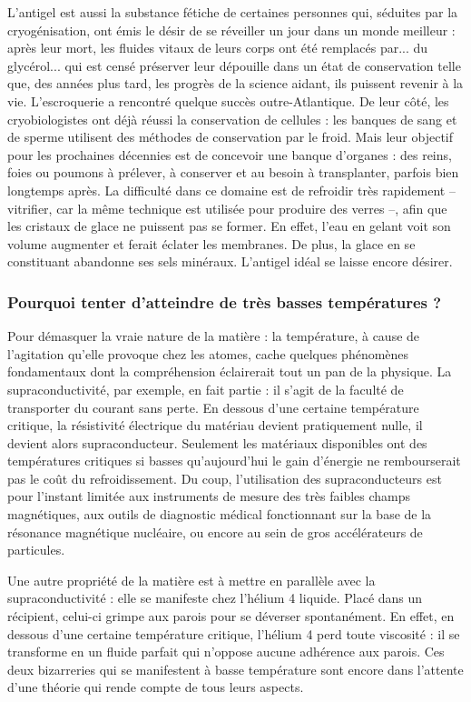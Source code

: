 L'antigel est aussi la substance fétiche de certaines personnes qui, séduites par la cryogénisation, ont émis le désir de se réveiller un jour dans un monde meilleur : après leur mort, les fluides vitaux de leurs corps ont été remplacés par... du glycérol... qui est censé préserver leur dépouille dans un état de conservation telle que, des années plus tard, les progrès de la science aidant, ils puissent revenir à la vie. L'escroquerie a rencontré quelque succès outre-Atlantique. De leur côté, les cryobiologistes ont déjà réussi la conservation de cellules : les banques de sang et de sperme utilisent des méthodes de conservation par le froid. Mais leur objectif pour les prochaines décennies est de concevoir une banque d'organes : des reins, foies ou poumons à prélever, à conserver et au besoin à transplanter, parfois bien longtemps après. La difficulté dans ce domaine est de refroidir très rapidement -- vitrifier, car la même technique est utilisée pour produire des verres --, afin que les cristaux de glace ne puissent pas se former. En effet, l'eau en gelant voit son volume augmenter et ferait éclater les membranes. De plus, la glace en se constituant abandonne ses sels minéraux. L'antigel idéal se laisse encore désirer.

\subsubsection{Pourquoi tenter d'atteindre de très basses températures ?}

Pour démasquer la vraie nature de la matière : la température, à cause de l'agitation qu'elle provoque chez les atomes, cache quelques phénomènes fondamentaux dont la compréhension éclairerait tout un pan de la physique. La supraconductivité, par exemple, en fait partie : il s'agit de la faculté de transporter du courant sans perte. En dessous d'une certaine température critique, la résistivité électrique du matériau devient pratiquement nulle, il devient alors supraconducteur. Seulement les matériaux disponibles ont des températures critiques si basses qu'aujourd'hui le gain d'énergie ne rembourserait pas le coût du refroidissement. Du coup, l'utilisation des supraconducteurs est pour l'instant limitée aux instruments de mesure des très faibles champs magnétiques, aux outils de diagnostic médical fonctionnant sur la base de la résonance magnétique nucléaire, ou encore au sein de gros accélérateurs de particules.

Une autre propriété de la matière est à mettre en parallèle avec la supraconductivité : elle se manifeste chez l'hélium 4 liquide. Placé dans un récipient, celui-ci grimpe aux parois pour se déverser spontanément. En effet, en dessous d'une certaine température critique, l'hélium 4 perd toute viscosité : il se transforme en un fluide parfait qui n'oppose aucune adhérence aux parois. Ces deux bizarreries qui se manifestent à basse température sont encore dans l'attente d'une théorie qui rende compte de tous leurs aspects.